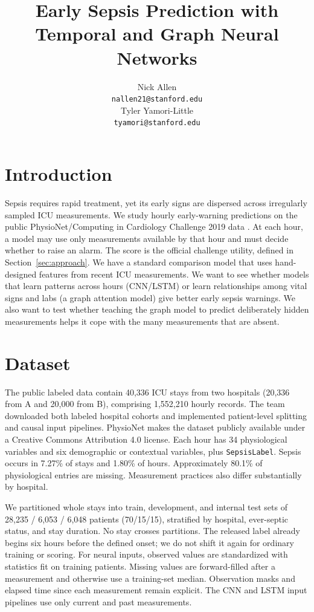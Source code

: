 \documentclass{article}
\title{Early Sepsis Prediction with Temporal and Graph Neural Networks}
\author{%
  Nick Allen \\
  \texttt{nallen21@stanford.edu} \\
  \And
  Tyler Yamori-Little \\
  \texttt{tyamori@stanford.edu} \\
}
\begin{document}
\maketitle

\section{Introduction}
Sepsis requires rapid treatment, yet its early signs are dispersed across irregularly sampled ICU measurements. We study hourly early-warning predictions on the public PhysioNet/Computing in Cardiology Challenge 2019 data \cite{reyna2019}. At each hour, a model may use only measurements available by that hour and must decide whether to raise an alarm. The score is the official challenge utility, defined in Section~\ref{sec:approach}. We have a standard comparison model that uses hand-designed features from recent ICU measurements. We want to see whether models that learn patterns across hours (CNN/LSTM) or learn relationships among vital signs and labs (a graph attention model) give better early sepsis warnings. We also want to test whether teaching the graph model to predict deliberately hidden measurements helps it cope with the many measurements that are absent.

\section{Dataset}
The public labeled data contain 40,336 ICU stays from two hospitals (20,336 from A and 20,000 from B), comprising 1,552,210 hourly records. The team downloaded both labeled hospital cohorts and implemented patient-level splitting and causal input pipelines. PhysioNet makes the dataset publicly available under a Creative Commons Attribution 4.0 license. Each hour has 34 physiological variables and six demographic or contextual variables, plus \texttt{SepsisLabel}. Sepsis occurs in 7.27\% of stays and 1.80\% of hours. Approximately 80.1\% of physiological entries are missing. Measurement practices also differ substantially by hospital.

We partitioned whole stays into train, development, and internal test sets of 28,235 / 6,053 / 6,048 patients (70/15/15), stratified by hospital, ever-septic status, and stay duration. No stay crosses partitions. The released label already begins six hours before the defined onset; we do not shift it again for ordinary training or scoring. For neural inputs, observed values are standardized with statistics fit on training patients. Missing values are forward-filled after a measurement and otherwise use a training-set median. Observation masks and elapsed time since each measurement remain explicit. The CNN and LSTM input pipelines use only current and past measurements.
\end{document}
